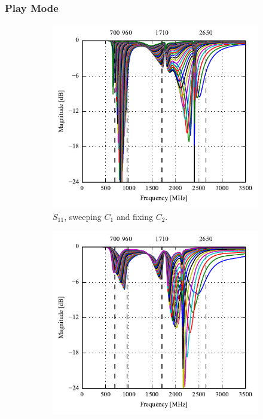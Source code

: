 \FloatBarrier
\subsubsection{Play Mode}

  \begin{figure}[htbp]
    \begin{subfigure}[b]{0.49\linewidth}
      \centering
      \includegraphics{img/tech_sol/monopole/highband/ue/playmode/s11.pdf}
      \caption{$S_{11}$, sweeping $C_1$ and fixing $C_2$.}
    \end{subfigure}
    \hfill
    \begin{subfigure}[b]{0.49\linewidth}
        \centering
        \includegraphics{img/tech_sol/monopole/highband/ue/playmode/s22.pdf}

\end{subfigure}
\end{figure}
